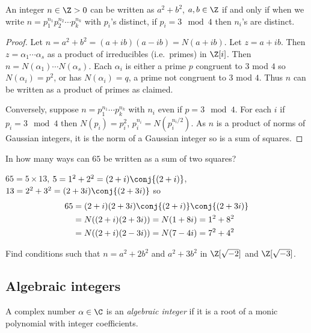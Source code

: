 \documentclass[a4paper]{article}
\theoremstyle{definition}
\begin{document}
\begin{corollary}
  An integer \(n \in \Z > 0\) can be written as \(a^2 + b^2\), \(a, b \in \Z\) if and only if when we write \(n = p_1^{n_1}p_2^{n_2}\cdots p_k^{n_k}\) with \(p_i\)'s distinct, if \(p_i = 3 \mod 4\) then \(n_i\)'s are distinct.
\end{corollary}

\begin{proof}
  Let \(n = a^2 + b^2 = (a + ib)(a - ib) = N(a + ib)\). Let \(z = a + ib\). Then \(z = \alpha_1\cdots \alpha_s\) as a product of irreducibles (i.e.\ primes) in \(\Z[i]\). Then \(n = N(\alpha_1)\cdots N(\alpha_s)\). Each \(\alpha_i\) is either a prime \(p\) congruent to \(3\) mod \(4\) so \(N(\alpha_i) = p^2\), or has \(N(\alpha_i) = q\), a prime not congruent to \(3\) mod \(4\). Thus \(n\) can be written as a product of primes as claimed.

  Conversely, suppose \(n = p_1^{n_1} \cdots p_k^{n_k}\) with \(n_i\) even if \(p = 3 \mod 4\). For each \(i\) if \(p_i = 3 \mod 4\) then \(N(p_i) = p_i^2\), \(p_i^{n_i} = N(p_i^{n_i/2})\). As \(n\) is a product of norms of Gaussian integers, it is the norm of a Gaussian integer so is a sum of squares.
\end{proof}

\begin{eg}
  In how many ways can \(65\) be written as a sum of two squares?
  
  \(65 = 5 \times 13\), \(5 = 1^2 + 2^2 = (2 + i) \conj{(2 + i)}\), \(13 = 2^2 + 3^2 = (2 + 3i)\conj{(2 + 3i)}\) so
    \begin{align*}
      65 &= (2 + i)(2 + 3i)\conj{(2 + i)}\conj{(2 + 3i)} \\
         &= N((2 + i)(2 + 3i)) = N(1 + 8i) = 1^2 + 8^2 \\
         &= N((2 + i)(2 - 3i)) = N(7 - 4i) = 7^2 + 4^2
    \end{align*}
\end{eg}

\begin{ex}[Challenge]
  Find conditions such that \(n = a^2 + 2b^2\) and \(a^2 + 3b^2\) in \(\Z[\sqrt{-2}]\) and \(\Z[\sqrt{-3}]\).
\end{ex}

\subsection{Algebraic integers}

\begin{definition}
  A complex number \(\alpha \in \C\) is an \emph{algebraic integer} if it is a root of a monic polynomial with integer coefficients.
\end{definition}
\end{document}
